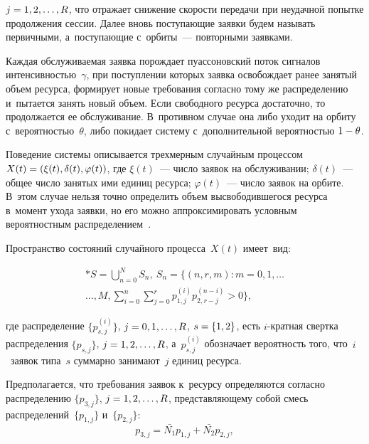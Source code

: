 \begin{multicols}{2}
\pagebreak

\noindent
 $j\hm=1,2,\ldots, R$, что отражает снижение ско\-рости 
переда\-чи при неудачной попытке продолжения сес\-сии. Далее вновь поступающие 
заявки будем называть первичными, а~по\-сту\-па\-ющие с~орбиты~--- по\-втор\-ны\-ми за\-яв\-ками.


Каждая обслуживаемая заявка порождает пуассоновский поток сигналов 
ин\-тен\-сив\-ностью~$\gamma$, при по\-ступ\-ле\-нии которых заявка освобождает ранее 
занятый объем ресурса, формирует новые требования согласно тому же распределению и~пытается занять новый объем. Если свободного ресурса достаточно, то 
продолжается ее обслуживание. В~противном случае она либо уходит на орбиту с~ве\-ро\-ят\-ностью~$\theta$, 
либо покидает сис\-те\-му с~дополнительной ве\-ро\-ят\-ностью $1\hm-\theta$.

Поведение системы описывается трехмерным случайным процессом $X(t)\hm=\left( 
\xi(t), \delta(t), \varphi(t) \right)$, где $\xi (t)$~--- чис\-ло заявок на 
обслуживании; $\delta(t)$~--- общее чис\-ло занятых ими единиц ресурса; 
$\varphi(t)$~--- чис\-ло заявок на орбите. В~этом случае нельзя точ\-но определить 
объем высвободившегося ресурса в~момент ухода заявки, но его можно 
аппроксимировать условным вероятностным распределением~\cite{resmo, tutorial2022}.

Пространство со\-сто\-яний случайного процесса~$X(t)$ име\-ет~вид:

\vspace*{-6pt}

\noindent
\begin{multline*}
*\label{eqn:stateSpace}
     S=\mathop{\bigcup}\limits_{n=0}^N S_n, \
     S_n=\Bigg\{ (n,r,m): m=0,1,\ldots\\
     \ldots ,M, \sum\limits_{i=0}^n 
\sum\limits_{j=0}^r p_{1,j}^{(i )} p_{2,r-j}^{(n-i)}>0 \Bigg\},
\end{multline*}

\vspace*{-3pt}

\noindent
где распределение $\{ p_{s,j}^{(i)} \}$, $j\hm=0,1,\ldots ,R$, $s\hm=\{1,2\}$, есть $i$-крат\-ная 
сверт\-ка распределения $\{p_{s,j}\}$, $j\hm=1,2,\ldots ,R$, а~$p_{s,j}^{(i)}$ 
обозначает ве\-ро\-ят\-ность того, что~$i$~заявок типа~$s$ суммарно занимают~$j$ 
единиц ре\-сурса.

Предполагается, что требования заявок к~ресурсу определяются согласно 
распределению $\{p_{3,j}\}$, $j\hm=1,2,\ldots ,R$, пред\-став\-ля\-юще\-му собой смесь 
распределений~$\{p_ {1,j}\}$ и~$\{p_{2,j}\}$:
\begin{equation*} 
    p_{3,j}=\bar{N_1} p_{1,j} + \bar{N_2} p_{2,j},
\end{equation*}




\end{multicols}
